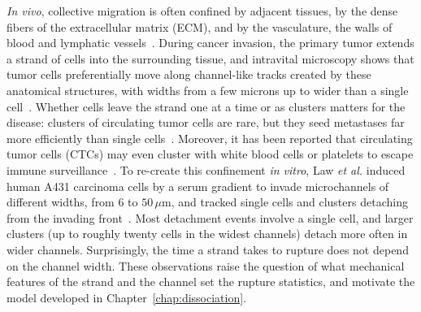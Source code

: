 \textit{In vivo}, collective migration is often confined by adjacent tissues, by the dense fibers of the extracellular matrix (ECM), and by the vasculature, the walls of blood and lymphatic vessels~\cite{tarle2017modeling, balzer2012physical, lin2025gradients}.
During cancer invasion, the primary tumor extends a strand of cells into the surrounding tissue, and intravital microscopy shows that tumor cells preferentially move along channel-like tracks created by these anatomical structures, with widths from a few microns up to wider than a single cell~\cite{paul2017cancer, weigelin2012intravital, wolf2009collagen}.
Whether cells leave the strand one at a time or as clusters matters for the disease: clusters of circulating tumor cells are rare, but they seed metastases far more efficiently than single cells~\cite{cheung2016collective, green2022pillarx, dirusso2024beyond}.
Moreover, it has been reported that circulating tumor cells (CTCs) may even cluster with white blood cells or platelets to escape immune surveillance~\cite{saini2019circulating}.
To re-create this confinement \textit{in vitro}, Law \textit{et al.} induced human A431 carcinoma cells by a serum gradient to invade microchannels of different widths, from $6$ to $50\,\mu\mathrm{m}$, and tracked single cells and clusters detaching from the invading front~\cite{law2023cytokinesis}.
Most detachment events involve a single cell, and larger clusters (up to roughly twenty cells in the widest channels) detach more often in wider channels.
Surprisingly, the time a strand takes to rupture does not depend on the channel width.
These observations raise the question of what mechanical features of the strand and the channel set the rupture statistics, and motivate the model developed in Chapter~\ref{chap:dissociation}.


